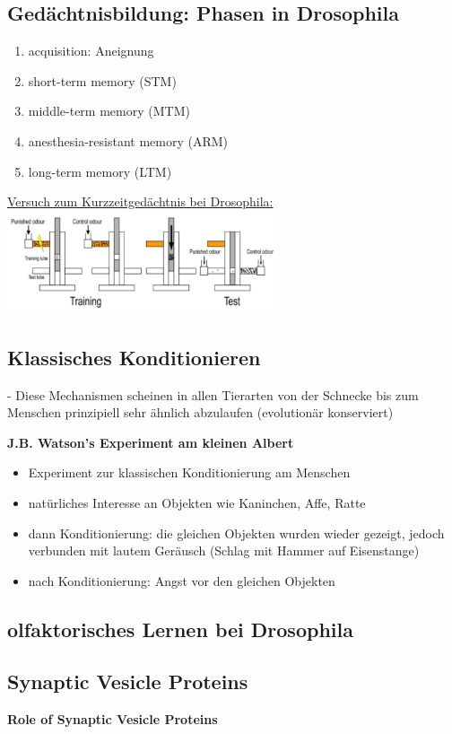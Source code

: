 \subsection{Gedächtnisbildung: Phasen in Drosophila}
\begin{enumerate}
	\item acquisition: Aneignung
	\item short-term memory (STM)
	\item middle-term memory (MTM)
	\item anesthesia-resistant memory (ARM)
	\item long-term memory (LTM)
\end{enumerate}

\underline{Versuch zum Kurzzeitgedächtnis bei Drosophila:}\\
\includegraphics[width=0.6\textwidth]{lectures/160615/pix/short_term_memory_drsophila.png}

\subsection{Klassisches Konditionieren}
 - Diese Mechanismen scheinen in allen Tierarten von der Schnecke bis zum Menschen prinzipiell sehr ähnlich abzulaufen (evolutionär konserviert)

\textbf{J.B. Watson's Experiment am kleinen Albert}
\begin{itemize}
	\item Experiment zur klassischen Konditionierung am Menschen
	\item natürliches Interesse an Objekten wie Kaninchen, Affe, Ratte
	\item dann Konditionierung: die gleichen Objekten wurden wieder gezeigt, jedoch verbunden mit lautem Geräusch (Schlag mit Hammer auf Eisenstange)
	\item nach Konditionierung: Angst vor den gleichen Objekten
\end{itemize}

\subsection{olfaktorisches Lernen bei Drosophila}

\subsection{Synaptic Vesicle Proteins}

\textbf{Role of Synaptic Vesicle Proteins}
